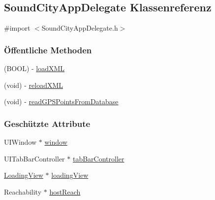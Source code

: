\hypertarget{interface_sound_city_app_delegate}{
\subsection{SoundCityAppDelegate Klassenreferenz}
\label{interface_sound_city_app_delegate}
}


{\ttfamily \#import $<$SoundCityAppDelegate.h$>$}\subsubsection*{Öffentliche Methoden}
\begin{DoxyCompactItemize}
\item 
(BOOL) -\/ \hyperlink{interface_sound_city_app_delegate_a7aa1b9b78348047311af130f2714596f}{loadXML}
\item 
(void) -\/ \hyperlink{interface_sound_city_app_delegate_ab52c63a7c4dcb1303a96f4acd3f4db0f}{reloadXML}
\item 
(void) -\/ \hyperlink{interface_sound_city_app_delegate_ac8941fa34f517a66ec3db85d928ba0a0}{readGPSPointsFromDatabase}
\end{DoxyCompactItemize}
\subsubsection*{Geschützte Attribute}
\begin{DoxyCompactItemize}
\item 
UIWindow $\ast$ \hyperlink{interface_sound_city_app_delegate_a69c920faf02b68581fdc0543ff0e56a1}{window}
\item 
UITabBarController $\ast$ \hyperlink{interface_sound_city_app_delegate_aae84b25a8186a168c98ad9584e31e332}{tabBarController}
\item 
\hyperlink{interface_loading_view}{LoadingView} $\ast$ \hyperlink{interface_sound_city_app_delegate_ae8ac0a409e5e027419977730dfb7fa76}{loadingView}
\item 
Reachability $\ast$ \hyperlink{interface_sound_city_app_delegate_ab7e88e1a16d0c057c86cef12fc6fcb93}{hostReach}
\end{DoxyCompactItemize}
